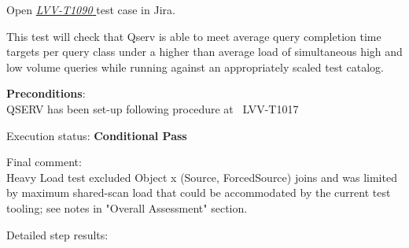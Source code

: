 \documentclass[DM,STR,toc]{lsstdoc}
\begin{document}
Open  \href{https://jira.lsstcorp.org/secure/Tests.jspa#/testCase/LVV-T1090}{\textit{ LVV-T1090 } }
test case in Jira.

    This test will check that Qserv is able to meet average query completion
time targets per query class under a higher than average load of
simultaneous high and low volume queries while running against an
appropriately scaled test catalog.


    \textbf{ Preconditions}:\\
    QSERV has been set-up following procedure at ~LVV-T1017


    Execution status: {\bf Conditional Pass }

    Final comment:\\Heavy Load test excluded Object x (Source, ForcedSource) joins and was
limited by maximum shared-scan load that could be accommodated by the
current test tooling; see notes in "Overall Assessment" section.



    Detailed step results:
\end{document}
